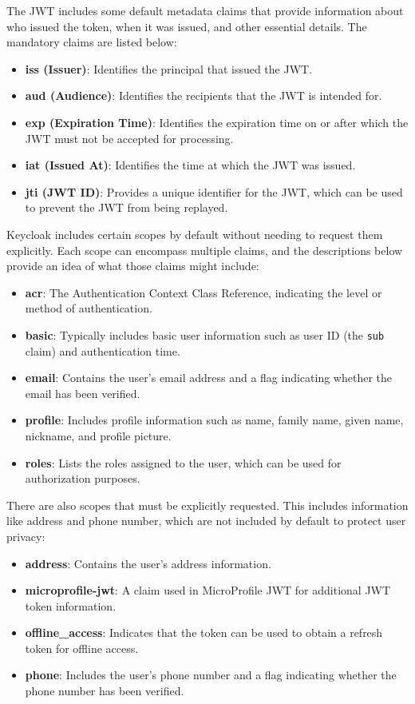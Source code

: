 The JWT includes some default metadata claims that provide information about who issued the token, when it was issued, and other essential details. The mandatory claims are listed below:

\begin{itemize} 
    \item \textbf{iss (Issuer)}: Identifies the principal that issued the JWT.
    \item \textbf{aud (Audience)}: Identifies the recipients that the JWT is intended for. 
    \item \textbf{exp (Expiration Time)}: Identifies the expiration time on or after which the JWT must not be accepted for processing. 
    \item \textbf{iat (Issued At)}: Identifies the time at which the JWT was issued. 
    \item \textbf{jti (JWT ID)}: Provides a unique identifier for the JWT, which can be used to prevent the JWT from being replayed. 
\end{itemize}

Keycloak includes certain scopes by default without needing to request them explicitly. Each scope can encompass multiple claims, and the descriptions below provide an idea of what those claims might include:

\begin{itemize} 
    \item \textbf{acr}: The Authentication Context Class Reference, indicating the level or method of authentication. 
    \item \textbf{basic}: Typically includes basic user information such as user ID (the \texttt{sub} claim) and authentication time. 
    \item \textbf{email}: Contains the user's email address and a flag indicating whether the email has been verified. 
    \item 
    \textbf{profile}: Includes profile information such as name, family name, given name, nickname, and profile picture. 
    \item \textbf{roles}: Lists the roles assigned to the user, which can be used for authorization purposes. 
\end{itemize}

There are also scopes that must be explicitly requested. This includes information like address and phone number, which are not included by default to protect user privacy:

\begin{itemize} 
    \item \textbf{address}: Contains the user's address information. 
    \item \textbf{microprofile-jwt}: A claim used in MicroProfile JWT for additional JWT token information. 
    \item \textbf{offline\_access}: Indicates that the token can be used to obtain a refresh token for offline access. 
    \item \textbf{phone}: Includes the user's phone number and a flag indicating whether the phone number has been verified. 
\end{itemize}

